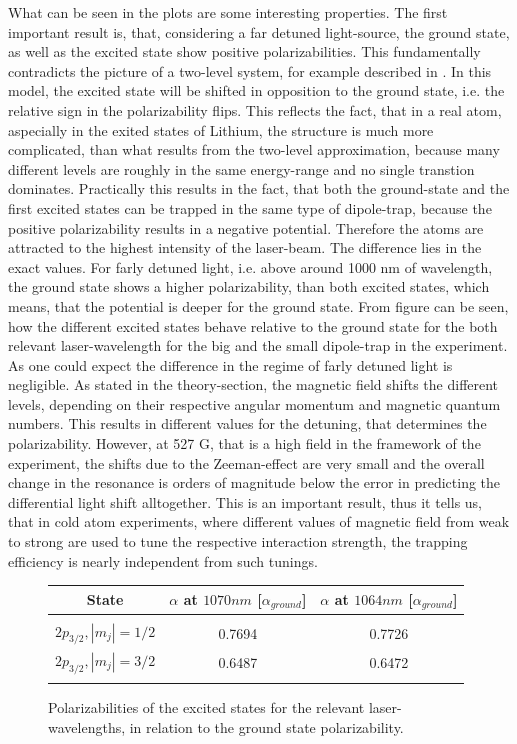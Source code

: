 What can be seen in the plots are some interesting properties. The first important result is, that, considering a far detuned light-source, the ground state, as well as the excited state show positive polarizabilities. This fundamentally contradicts the picture of a two-level system, for example described in \cite{cohen}. In this model, the excited state will be shifted in opposition to the ground state, i.e. the relative sign in the polarizability flips. This reflects the fact, that in a real atom, aspecially in the exited states of Lithium, the structure is much more complicated, than what results from the two-level approximation, because many different levels are roughly in the same energy-range and no single transtion dominates. Practically this results in the fact, that both the ground-state and the first excited states can be trapped in the same type of dipole-trap, because the positive polarizability results in a negative potential. Therefore the atoms are attracted to the highest intensity of the laser-beam. The difference lies in the exact values. For farly detuned light, i.e. above around 1000 nm of wavelength, the ground state shows a higher polarizability, than both excited states, which means, that the potential is deeper for the ground state. From figure \label{relativealpha} can be seen, how the different excited states behave relative to the ground state for the both relevant laser-wavelength for the big and the small dipole-trap in the experiment. As one could expect the difference in the regime of farly detuned light is negligible. As stated in the theory-section, the magnetic field shifts the different levels, depending on their respective angular momentum and magnetic quantum numbers. This results in different values for the detuning, that determines the polarizability. However, at 527 G, that is a high field in the framework of the experiment, the shifts due to the Zeeman-effect are very small and the overall change in the resonance is orders of magnitude below the error in predicting the differential light shift alltogether. This is an important result, thus it tells us, that in cold atom experiments, where different values of magnetic field from weak to strong are used to tune the respective interaction strength, the trapping efficiency is nearly independent from such tunings.

\begin{figure}[h]
\begin{center}
\begin{tabular}{ccc}
State&$\alpha$ at $1070\unit{nm}$ [$\unit{\alpha_{ground}}$]&$\alpha$ at $1064\unit{nm}$ [$\unit{\alpha_{ground}}$]\\\hline\hline\\
$2p_{3/2}, |m_j|=1/2$&0.7694&0.7726\\
$2p_{3/2}, |m_j|=3/2$&0.6487&0.6472\\
\\\hline
\end{tabular}
\end{center}
\caption{Polarizabilities of the excited states for the relevant laser-wavelengths, in relation to the ground state polarizability.}
\label{relativealpha}
\end{figure}

